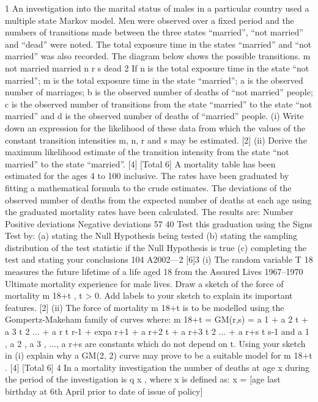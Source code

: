 \documentclass[a4paper,12pt]{article}
\begin{document}
1
An investigation into the marital status of males in a particular country used a
multiple state Markov model. Men were observed over a fixed period and the
numbers of transitions made between the three states “married”, “not married” and
“dead” were noted. The total exposure time in the states “married” and “not married”
was also recorded. The diagram below shows the possible transitions.
m
not married
married
n
r
s
dead
2
If n is the total exposure time in the state “not married”;
m is the total exposure time in the state “married”;
a is the observed number of marriages;
b is the observed number of deaths of “not married” people;
c is the observed number of transitions from the state “married” to the state
“not married” and
d is the observed number of deaths of “married” people.
(i) Write down an expression for the likelihood of these data from which the
values of the constant transition intensities m, n, r and s may be estimated. [2]
(ii) Derive the maximum likelihood estimate of the transition intensity from the
state “not married” to the state “married”.
[4]
[Total 6]
A mortality table has been estimated for the ages 4 to 100 inclusive. The rates have
been graduated by fitting a mathematical formula to the crude estimates. The
deviations of the observed number of deaths from the expected number of deaths at
each age using the graduated mortality rates have been calculated. The results are:
Number
Positive deviations
Negative deviations
57
40
Test this graduation using the Signs Test by:
(a) stating the Null Hypothesis being tested
(b) stating the sampling distribution of the test statistic if the Null Hypothesis is
true
(c) completing the test and stating your conclusions
104 A2002—2
[6]3
(i)
The random variable T 18 measures the future lifetime of a life aged 18 from
the Assured Lives 1967–1970 Ultimate mortality experience for male lives.
Draw a sketch of the force of mortality m 18+t , t > 0. Add labels to your sketch
to explain its important features.
[2]
(ii)
The force of mortality m 18+t is to be modelled using the Gompertz-Makeham
family of curves where:
m 18+t = GM(r,s) = a 1 + a 2 t + a 3 t 2 ... + a r t r-1
+ exp{a r+1 + a r+2 t + a r+3 t 2 ... + a r+s t s-1 }
and a 1 , a 2 , a 3 , ..., a r+s are constants which do not depend on t.
Using your sketch in (i) explain why a GM(2, 2) curve may prove to be a
suitable model for m 18+t .
[4]
[Total 6]
4
In a mortality investigation the number of deaths at age x during the period of the
investigation is q x , where x is defined as:
x = [age last birthday at 6th April prior to date of issue of policy]
\end{document}
